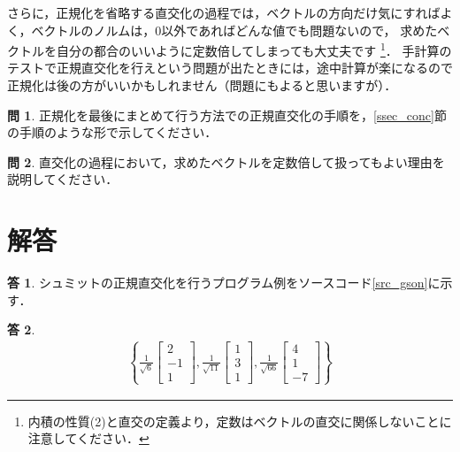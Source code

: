 \documentclass[dvipdfmx]{jsarticle}
\theoremstyle{definition}
\newtheorem{question}{問}[section]
\newtheorem{answer}{答}[section]
\begin{document}
さらに，正規化を省略する直交化の過程では，ベクトルの方向だけ気にすればよく，ベクトルのノルムは，0以外であればどんな値でも問題ないので，
求めたベクトルを自分の都合のいいように定数倍してしまっても大丈夫です
\footnote{内積の性質(2)と直交の定義より，定数はベクトルの直交に関係しないことに注意してください．}．
手計算のテストで正規直交化を行えという問題が出たときには，途中計算が楽になるので正規化は後の方がいいかもしれません（問題にもよると思いますが）．

\begin{question}
    正規化を最後にまとめて行う方法での正規直交化の手順を，\ref{ssec_conc}節の手順のような形で示してください．
\end{question}

\begin{question}
    直交化の過程において，求めたベクトルを定数倍して扱ってもよい理由を説明してください．
\end{question}



\section{解答}
\setcounter{section}{3}

\begin{answer}
    シュミットの正規直交化を行うプログラム例をソースコード\ref{src_gson}に示す．
    
\end{answer}

\begin{answer}
    \begin{align*}
        \left\{
            \frac{1}{\sqrt{6}} \begin{bmatrix} 2 \\ -1 \\ 1 \end{bmatrix},
            \frac{1}{\sqrt{11}} \begin{bmatrix} 1 \\ 3 \\ 1 \end{bmatrix},
            \frac{1}{\sqrt{66}} \begin{bmatrix} 4 \\ 1 \\ -7 \end{bmatrix}
        \right\}
    \end{align*}
\end{answer}
\end{document}
